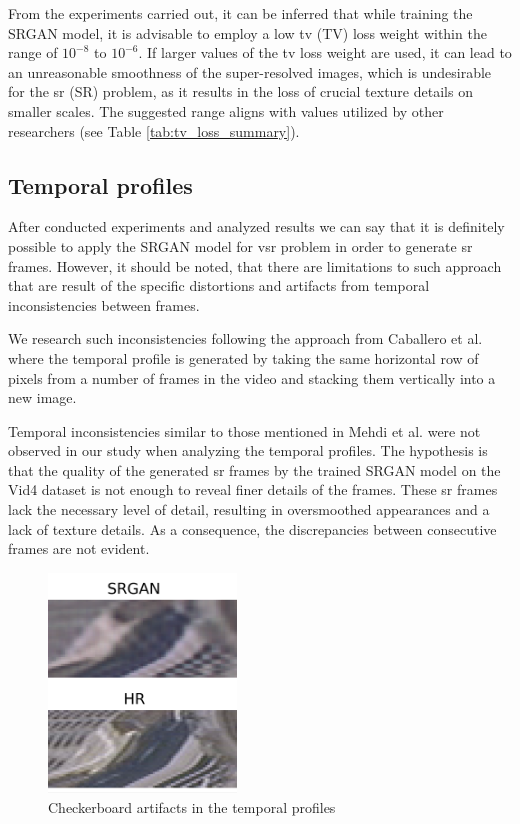 \documentclass[conference]{IEEEtran}
\begin{document}
From the experiments carried out, it can be inferred that while training the SRGAN model, it is advisable to employ a low \acrlong{tv} (TV) loss weight within the range of $10^{-8}$ to $10^{-6}$. If larger values of the \acrshort{tv} loss weight are used, it can lead to an unreasonable smoothness of the super-resolved images, which is undesirable for the \acrlong{sr} (SR) problem, as it results in the loss of crucial texture details on smaller scales. The suggested range aligns with values utilized by other researchers (see Table \ref{tab:tv_loss_summary}).

\subsection{Temporal profiles}

After conducted experiments and analyzed results we can say that it is definitely possible to apply the SRGAN model for \acrshort{vsr} problem in order to generate \acrshort{sr} frames. However, it should be noted, that there are limitations to such approach that are result of the specific distortions and artifacts from temporal inconsistencies between frames.

We research such inconsistencies following the approach from Caballero et al. \cite{Real_Time_Video_Super_Resolution_with_Spatio_Temporal_Networks_and_Motion_Compensation_2016} where the temporal profile is generated by taking the same horizontal row of pixels from a number of frames in the video and stacking them vertically into a new image.

Temporal inconsistencies similar to those mentioned in Mehdi et al. \cite{frvsr_2018} were not observed in our study when analyzing the temporal profiles. The hypothesis is that the quality of the generated \acrshort{sr} frames by the trained SRGAN model on the Vid4 dataset is not enough to reveal finer details of the frames. These \acrshort{sr} frames lack the necessary level of detail, resulting in oversmoothed appearances and a lack of texture details. As a consequence, the discrepancies between consecutive frames are not evident.

\begin{figure}[!htb]
	\centering
    \centerline{\includegraphics[width=5cm]{results/tempo/checkboard_artifacts}}
	\caption{Checkerboard artifacts in the temporal profiles}
	\label{fig:checkerboard_artifacts}
\end{figure}
\end{document}
